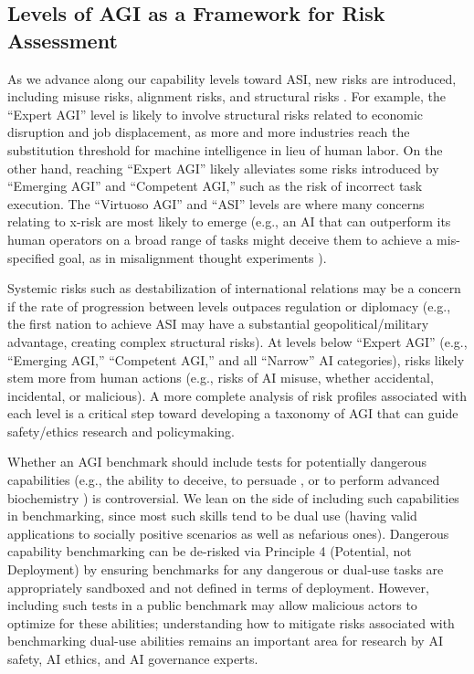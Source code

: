 \documentclass{article}
\theoremstyle{plain}
\theoremstyle{definition}
\theoremstyle{remark}
\begin{document}
\subsection{Levels of AGI as a Framework for Risk Assessment}
\label{riskFramework}

As we advance along our capability levels toward ASI, new risks are introduced, including misuse risks, alignment risks, and structural risks \citep{zwetsloot2019thinking}. For example, the “Expert AGI” level is likely to involve structural risks related to economic disruption and job displacement, as more and more industries reach the substitution threshold for machine intelligence in lieu of human labor. On the other hand, reaching “Expert AGI” likely alleviates some risks introduced by “Emerging AGI” and “Competent AGI,” such as the risk of incorrect task execution. The “Virtuoso AGI” and “ASI” levels are where many concerns relating to x-risk are most likely to emerge (e.g., an AI that can outperform its human operators on a broad range of tasks might deceive them to achieve a mis-specified goal, as in misalignment thought experiments \citep{alignment}).

Systemic risks such as destabilization of international relations may be a concern if the rate of progression between levels outpaces regulation or diplomacy (e.g., the first nation to achieve ASI may have a substantial geopolitical/military advantage, creating complex structural risks). At levels below “Expert AGI” (e.g., “Emerging AGI,” “Competent AGI,” and all “Narrow” AI categories), risks likely stem more from human actions (e.g., risks of AI misuse, whether accidental, incidental, or malicious). A more complete analysis of risk profiles associated with each level is a critical step toward developing a taxonomy of AGI that can guide safety/ethics research and policymaking. 

Whether an AGI benchmark should include tests for potentially dangerous capabilities (e.g., the ability to deceive, to persuade \citep{subliminal}, or to perform advanced biochemistry \citep{morris2023scientists}) is controversial. We lean on the side of including such capabilities in benchmarking, since most such skills tend to be dual use (having valid applications to socially positive scenarios as well as nefarious ones). Dangerous capability benchmarking can be de-risked via Principle 4 (Potential, not Deployment) by ensuring benchmarks for any dangerous or dual-use tasks are appropriately sandboxed and not defined in terms of deployment. However, including such tests in a public benchmark may allow malicious actors to optimize for these abilities; understanding how to mitigate risks associated with benchmarking dual-use abilities remains an important area for research by AI safety, AI ethics, and AI governance experts.%
\end{document}
